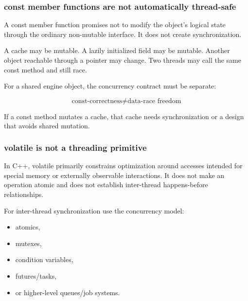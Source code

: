 \subsubsection{const member functions are not automatically thread-safe}\label{01-foundations-i-ch005-const-member-functions-are-not-automatically-thread-safe}

\hypertarget{01-foundations-i-ch005-const-member-functions-are-not-automatically-thread-safe}{}

A const member function promises not to modify the object's logical state through the ordinary non-mutable interface. It does not create synchronization.

A cache may be mutable. A lazily initialized field may be mutable. Another object reachable through a pointer may change. Two threads may call the same const method and still race.

For a shared engine object, the concurrency contract must be separate:

\[
\boxed{
\text{const-correctness}
\neq
\text{data-race freedom}
}
\]

If a const method mutates a cache, that cache needs synchronization or a design that avoids shared mutation.

\subsubsection{volatile is not a threading primitive}\label{01-foundations-i-ch005-volatile-is-not-a-threading-primitive}

\hypertarget{01-foundations-i-ch005-volatile-is-not-a-threading-primitive}{}

In C++, volatile primarily constrains optimization around accesses intended for special memory or externally observable interactions. It does not make an operation atomic and does not establish inter-thread happens-before relationships.

For inter-thread synchronization use the concurrency model:

\begin{itemize}
\tightlist
\item
  atomics,
\item
  mutexes,
\item
  condition variables,
\item
  futures/tasks,
\item
  or higher-level queues/job systems.
\end{itemize}


